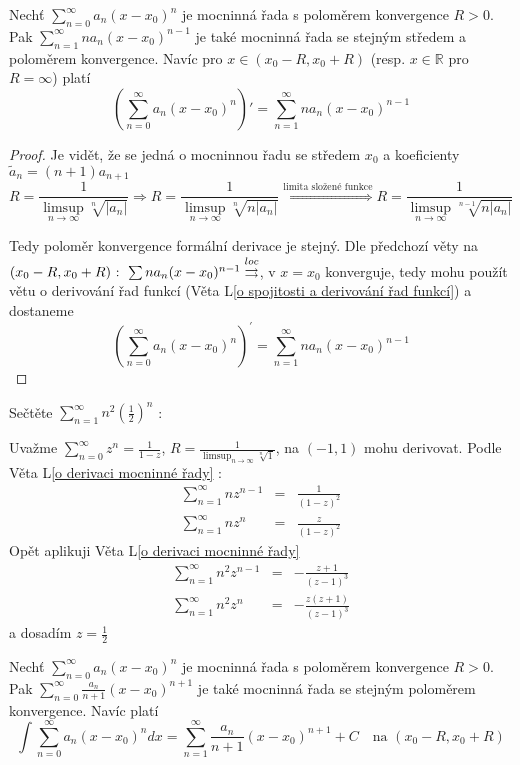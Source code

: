 \begin{vetal}
\label{o derivaci mocninné řady}
Nechť $\sum_{n=0}^{\infty} a_n (x-x_0)^n$ je mocninná řada s poloměrem konvergence $R > 0$. Pak $\sum_{n=1}^{\infty} n a_n (x-x_0)^{n-1}$ je také mocninná řada se stejným středem a poloměrem konvergence. Navíc pro $x \in ( x_0 - R, x_0 + R )$ (resp. $x \in\mathbb{R}$ pro $R = \infty$) platí
$$ \left( \sum_{n=0}^{\infty} a_n (x-x_0)^n \right)' = \sum_{n=1}^{\infty} n a_n (x-x_0)^{n-1}$$
\end{vetal}

\begin{proof}
Je vidět, že se jedná o mocninnou řadu se středem $x_0$ a koeficienty $\tilde{a}_n = (n+1)a_{n+1}$
$$R = \frac{1}{\limsup_{n \to \infty} \sqrt[n]{|a_n|}} \Rightarrow R = \frac{1}{\limsup_{n \to \infty} \sqrt[n]{n |a_n|}} \overset{\textrm{limita složené funkce}}{\Rightarrow} R = \frac{1}{\limsup_{n \to \infty} \sqrt[n-1]{n |a_n|}}$$

Tedy poloměr konvergence formální derivace je stejný. Dle předchozí věty na $(x_0 - R, x_0 + R) \textrm{ : } \sum n a_n (x-x_0)^{n-1} \overset{loc}{\rightrightarrows}$, v $x=x_0$ konverguje, tedy mohu použít větu o derivování řad funkcí (Věta L\ref{o spojitosti a derivování řad funkcí}) a dostaneme
$$\left( \sum_{n=0}^\infty a_n (x-x_0)^n \right)^\prime = \sum_{n=1}^\infty n a_n (x-x_0)^{n-1}$$
\end{proof}

\begin{priklad}
Sečtěte $\sum_{n=1}^\infty n^2 \left( \frac{1}{2} \right)^n$ :
\end{priklad}

Uvažme $\sum_{n=0}^\infty z^n = \frac{1}{1-z}$, $R = \frac{1}{\limsup_{n \to \infty} \sqrt[n]{1}}$, na $(-1, 1)$ mohu derivovat. Podle Věta L\ref{o derivaci mocninné řady} : 
\begin{eqnarray*}
\sum_{n=1}^\infty n z^{n-1} & = & \frac{1}{(1-z)^2} \\
\sum_{n=1}^\infty n z^n & = & \frac{z}{(1-z)^2}
\end{eqnarray*}
Opět aplikuji Věta L\ref{o derivaci mocninné řady}
\begin{eqnarray*}
\sum_{n=1}^\infty n^2 z^{n-1} & = & - \frac{z+1}{(z-1)^3} \\
\sum_{n=1}^\infty n^2 z^n & = & - \frac{z(z+1)}{(z-1)^3}
\end{eqnarray*}
a dosadím $z = \frac{1}{2}$

\begin{vetal}
Nechť $\sum_{n=0}^{\infty} a_n (x-x_0)^n$ je mocninná řada s poloměrem konvergence $R > 0$. Pak $\sum_{n=0}^{\infty} \frac{a_n}{n+1} \left(x-x_0 \right)^{n+1}$ je také mocninná řada se stejným poloměrem konvergence. Navíc platí
$$\int \sum_{n=0}^{\infty} a_n (x-x_0)^n dx = \sum_{n=1}^{\infty} \frac{a_n}{n+1} \left( x-x_0 \right)^{n+1} + C  \quad \textrm{na } \left( x_0 - R, x_0 + R \right)$$
\end{vetal}

